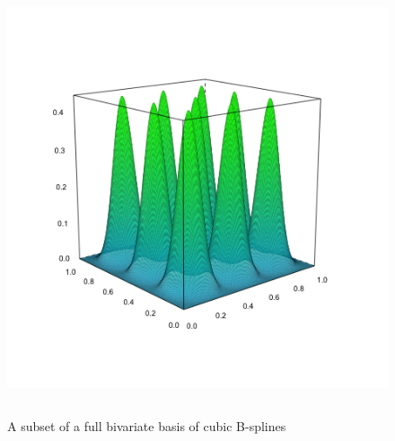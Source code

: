 \documentclass[12pt]{article}
\theoremstyle{definition}
\begin{document}
\begin{figure}[h]
  \centering
  \graphicspath{{img/}}
  \includegraphics[width=5in,height=5in]{sparse_bicubic_basis.png}
  \caption{A subset of a full bivariate basis of cubic B-splines}\label{fig:sparse_bicubic_BS_basis}
\end{figure}
\end{document}
